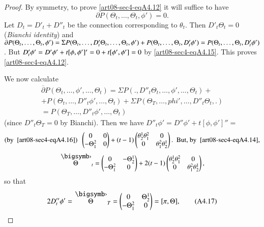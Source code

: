 \begin{proof}
By symmetry, to prove \eqref{art08-sec4-eqA4.12} it will suffice to have 
$$
\partial P(\Theta_{t},\ldots,\Theta_{t},\phi')=0.
$$ 
Let $D_{t}=D'_{t}+D''_{t}$ be the connection corresponding to $\theta_{t}$. Then $D'_{t}\Theta_{t}=0$ (\textit{Bianchi identity}) and $\partial P(\Theta_{t},\ldots,\Theta_{t},\phi')=\Sigma P(\Theta_{t},\ldots,D'_{t}\Theta_{t},\ldots,\Theta_{t},\phi')\break +P(\Theta_{t},\ldots,\Theta_{t},D'_{t}\phi')=P(\Theta_{t},\ldots,\Theta_{t},D'_{t}\phi')$. But $D'_{t}\phi'=D'\phi'+t[\phi,\phi']'\break =0+t[\phi',\phi']=0$ by \eqref{art08-sec4-eqA4.15}. This proves \eqref{art08-sec4-eqA4.12}.

We now calculate 
\begin{gather*}
\overline{\partial}P(\Theta_{t},\ldots,\phi',\ldots,\Theta_{t})=\Sigma P(.,D''_{t}\Theta_{t},\ldots,\phi',\ldots,\Theta_{t})+\\
 +P(\Theta_{t},\ldots,D''_{t}\phi',\ldots,\Theta_{t})+\Sigma P(\Theta_{T},\ldots,phi',\ldots,D''_{t}\Theta_{t},.)\\
=P(\Theta_{T},\ldots,D''_{t}\phi',\ldots,\Theta_{t})
 \end{gather*}
(since $D''_{t}\Theta_{T}=0$ by Bianchi). Then we have $D''_{t}\phi'=D''\phi'+t[\phi,\phi']''=$
\begin{gather*}
(\text{by~ \eqref{art08-sec4-eqA4.16}}) \ \ \left(\begin{matrix} 0 & 0 \\ -\Theta^{2}_{1} & 0\end{matrix}\right)+(t-1)\left(\begin{matrix} \theta^{1}_{2} \theta^{2}_{1} & 0 \\ 0 & \theta^{2}_{1}\theta^{1}_{2}\end{matrix}\right). \ \ \text{But, by~ \eqref{art08-sec4-eqA4.14},}\\[3pt]
\overdot{\Theta}_{t}=\left(\begin{matrix} 0 & -\Theta^{1}_{2}\\ - \Theta^{2}_{1} & 0\end{matrix}\right)+2(t-1)\left(\begin{matrix} \theta^{1}_{2}\theta^{2}_{1} & 0\\ 0 & \theta^{2}_{1}\theta^{1}_{2}\end{matrix}\right),
\end{gather*}
so that
\begin{equation*}
2D''_{t}\phi'=\overdot{\Theta}_{T}=\left(\begin{matrix} 0 & \Theta^{1}_{2}\\ -\Theta^{2}_{1} & 0\end{matrix}\right)=[\pi,\Theta],\tag{A4.17}\label{art08-sec4-eqA4.17}

\end{equation*}
\end{proof}
